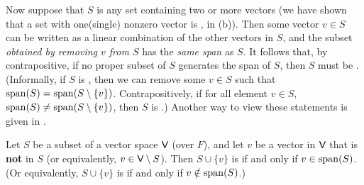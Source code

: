 Now suppose that \(S\) is any \LDP{} set containing two or more vectors
(we have shown that a set with one(single) nonzero vector is \LID{}, in (b)).
Then some vector \(v \in S\) can be written as a linear combination of the other vectors in \(S\), and the subset \emph{obtained by removing \(v\) from \(S\)} has the \emph{same span} as \(S\).
It follows that, by contrapositive, if no proper subset of \(S\) generates the span of \(S\), then \(S\) must be \LID{}.
(Informally, if \(S\) is \LDP{}, then we can remove some \(v \in S\) such that \(\operatorname{span}(S) = \operatorname{span}(S \setminus \{ v \})\).
Contrapositively, if for all element \(v \in S\), \(\operatorname{span}(S) \ne \operatorname{span}(S \setminus \{ v \})\), then \(S\) is \LID{}.)
Another way to view these statements is given in .

\begin{theorem} \label{thm 1.7}
Let \(S\) be a \LID{} subset of a vector space \(\textsf{V}\) (over \(F\)), and let \(v\) be a vector in \(\textsf{V}\) that is \textbf{not} in \(S\) (or equivalently, \(v \in \textsf{V} \setminus S\)).
Then \(S \cup \{v\}\) is \LDP{} if and only if \(v \in \operatorname{span}(S)\).
(Or equivalently, \(S \cup \{v\}\) is \LID{}{} if and only if \(v \notin \operatorname{span}(S)\).)
\end{theorem}

